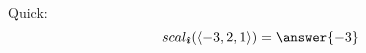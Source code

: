 \documentclass{ximera}
\author{Bart Snapp}
\begin{document}
\begin{exercise}

Quick:
\[
scal_{\boldsymbol{\hat{\imath}}}(\left< -3,2,1 \right>)=\answer{-3}
\]


\end{exercise}
\end{document}
